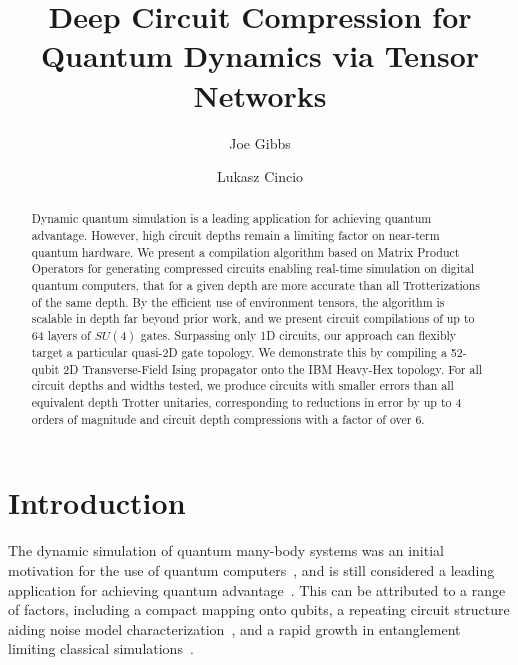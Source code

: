 \documentclass[a4paper,twocolumn,11pt,accepted=2025-06-10]{quantumarticle}
\begin{document}
\title{Deep Circuit Compression for Quantum Dynamics via Tensor Networks}

\author{Joe Gibbs}

\author{Lukasz Cincio}

\begin{abstract}
Dynamic quantum simulation is a leading application for achieving quantum advantage. However, high circuit depths remain a limiting factor on near-term quantum hardware. We present a compilation algorithm based on Matrix Product Operators for generating compressed circuits enabling real-time simulation on digital quantum computers, that for a given depth are more accurate than all Trotterizations of the same depth. By the efficient use of environment tensors, the algorithm is scalable in depth far beyond prior work, and we present circuit compilations of up to 64 layers of $SU(4)$ gates.
Surpassing only 1D circuits, our approach can flexibly target a particular quasi-2D
gate topology. We demonstrate this by compiling a 52-qubit 2D Transverse-Field Ising propagator onto the IBM Heavy-Hex topology. For all circuit depths and widths tested, we produce circuits with smaller errors than all equivalent depth Trotter unitaries, corresponding to reductions in error by up to 4 orders of magnitude and circuit depth compressions with a factor of over 6.
\end{abstract}

\maketitle

\section{Introduction}

The dynamic simulation of quantum many-body systems was an initial motivation for the use of quantum computers~\cite{feynman1982simulating}, and is still considered a leading application for achieving quantum advantage~\cite{kim2023evidence}.
This can be attributed to a range of factors, including a compact mapping onto qubits,
a repeating circuit structure aiding noise model characterization~\cite{berg2022probabilistic}, and a rapid growth in entanglement limiting classical simulations~\cite{schollwock2011density}. 
\end{document}
